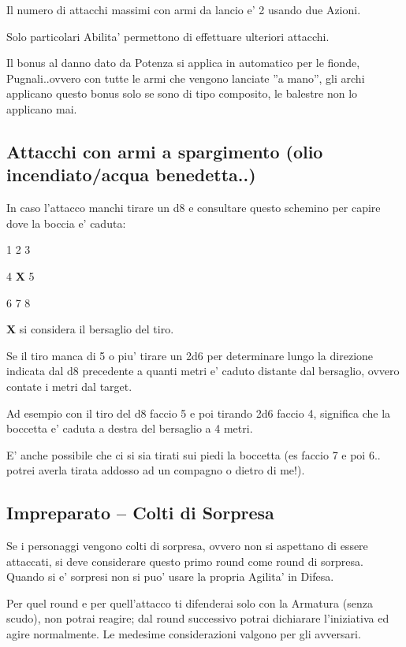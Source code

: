 \documentclass[a4paper,11pt,twoside,openany]{book}
\begin{document}
Il numero di attacchi massimi con armi da lancio e' 2 usando due Azioni.

Solo particolari Abilita' permettono di effettuare ulteriori attacchi.

Il bonus al danno dato da Potenza si applica in automatico per le fionde, Pugnali..ovvero con tutte le armi che vengono lanciate ''a mano'', gli archi applicano questo bonus solo se sono di tipo composito, le balestre non lo applicano mai.

\subsection{Attacchi con armi a spargimento (olio incendiato/acqua benedetta..)}

In caso l'attacco manchi tirare un d8 e consultare questo schemino per capire dove la boccia e' caduta:

1 2 3

4 \textbf{X} 5

6 7 8

\textbf{X} si considera il bersaglio del tiro.

Se il tiro manca di 5 o piu' tirare un 2d6 per determinare lungo la direzione indicata dal d8 precedente a quanti metri e' caduto distante dal bersaglio, ovvero contate i metri dal target.

Ad esempio con il tiro del d8 faccio 5 e poi tirando 2d6 faccio 4, significa che la boccetta e' caduta a destra del bersaglio a 4 metri.

E' anche possibile che ci si sia tirati sui piedi la boccetta (es faccio 7 e poi 6.. potrei averla tirata addosso ad un compagno o dietro di me!).

\subsection{Impreparato -- Colti di Sorpresa}

Se i personaggi vengono colti di sorpresa, ovvero non si aspettano di essere attaccati, si deve considerare questo primo round come round di sorpresa. Quando si e' sorpresi non si puo' usare la propria Agilita' in Difesa.

Per quel round e per quell'attacco ti difenderai solo con la Armatura (senza scudo), non potrai reagire; dal round successivo potrai dichiarare l'iniziativa ed agire normalmente. Le medesime considerazioni valgono per gli avversari.
\end{document}
